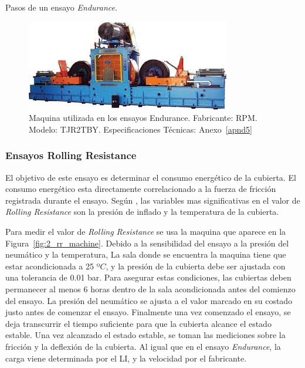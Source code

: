 \begin{table}
	\centering
	\caption{Pasos de un ensayo \textit{Endurance}.}
	
	\label{tab:1_tbl_qced_steps}
\end{table}

\begin{figure}[H]
	\begin{center}
		\includegraphics[width=\textwidth]{fig/2_endurance_machine}
	\end{center}
	\caption{Maquina utilizada en los ensayos Endurance. 
	Fabricante: RPM. Modelo: TJR2TBY. Especificaciones Técnicas: Anexo~\ref{apnd5}}
	\label{fig:2_endurance_machine}
\end{figure}

\subsubsection{Ensayos Rolling Resistance}
El objetivo de este ensayo es determinar el consumo energético de la cubierta.
El consumo energético esta directamente correlacionado
a la fuerza de fricción registrada durante el ensayo.
Según \citet{ydrefors2021rolling}, las variables mas significativas en el valor de \textit{Rolling Resistance} son la presión de inflado y la temperatura de la cubierta.

Para medir el valor de \textit{Rolling Resistance}
se usa la maquina que aparece en la Figura~\ref{fig:2_rr_machine}.
Debido a la sensibilidad del ensayo
a la presión del neumático y la temperatura,
La sala donde se encuentra la maquina tiene que estar acondicionada a 25 º$C$,
y la presión de la cubierta debe ser ajustada con una tolerancia de 0.01 bar.
Para asegurar estas condiciones, las cubiertas deben permanecer
al menos 6 horas dentro de la sala acondicionada antes del comienzo del ensayo.
La presión del neumático se ajusta a
el valor marcado en su costado justo antes de comenzar el ensayo.
Finalmente una vez comenzado el ensayo, se deja transcurrir
el tiempo suficiente para que la cubierta alcance el estado estable.
Una vez alcanzado el estado estable, se toman las mediciones
sobre la fricción y la deflexión de la cubierta.
Al igual que en el ensayo \textit{Endurance}, la carga viene determinada por el LI, y la velocidad por el fabricante.

